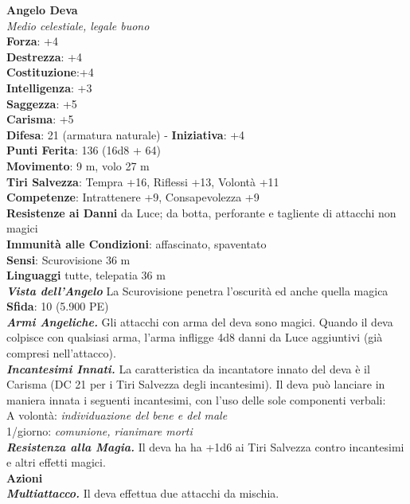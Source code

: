 \begin{multicols}{2}
\medskip\textbf{Angelo Deva}\\
\emph{Medio celestiale, legale buono}\\
\textbf{Forza}: +4\\
\textbf{Destrezza}: +4\\
\textbf{Costituzione}:+4\\
\textbf{Intelligenza}: +3\\
\textbf{Saggezza}: +5\\
\textbf{Carisma}: +5\\
\textbf{Difesa}: 21 (armatura naturale) - \textbf{Iniziativa}: +4\\
\textbf{Punti Ferita}: 136 (16d8 + 64)\\
\textbf{Movimento}: 9 m, volo 27 m\\
\textbf{Tiri Salvezza}: Tempra +16, Riflessi +13, Volontà +11\\
\textbf{Competenze}: Intrattenere +9, Consapevolezza +9\\
\textbf{Resistenze ai Danni} da Luce; da botta, perforante e tagliente di attacchi non magici\\
\textbf{Immunità alle Condizioni}: affascinato, spaventato\\
\textbf{Sensi}: Scurovisione 36 m\\
\textbf{Linguaggi} tutte, telepatia 36 m\\
\emph{\textbf{Vista dell'Angelo}} La Scurovisione penetra l'oscurità ed anche quella magica\\
\textbf{Sfida}: 10 (5.900 PE)\smallskip\\
\emph{\textbf{Armi Angeliche.}} Gli attacchi con arma del deva sono magici. Quando il deva colpisce con qualsiasi arma, l'arma infligge 4d8 danni da Luce aggiuntivi (già compresi nell'attacco).\\
\emph{\textbf{Incantesimi Innati.}} La caratteristica da incantatore innato del deva è il Carisma (DC  21 per i Tiri Salvezza degli incantesimi). Il deva può lanciare in maniera innata i seguenti incantesimi, con l'uso delle sole componenti verbali: \\
A volontà: \emph{individuazione del bene e del male}\\
1/giorno: \emph{comunione, rianimare morti}\\
\emph{\textbf{Resistenza alla Magia.}} Il deva ha ha +1d6 ai Tiri Salvezza contro incantesimi e altri effetti magici.\\
\smallskip\textbf{Azioni}\\
\emph{\textbf{Multiattacco.}} Il deva effettua due attacchi da mischia.\\

\end{multicols}
